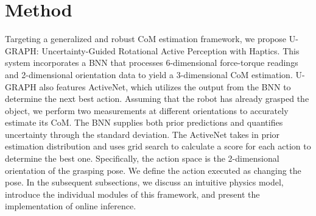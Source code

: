 

\section{Method}

Targeting a generalized and robust CoM estimation framework, we propose U-GRAPH: Uncertainty-Guided Rotational Active Perception with Haptics. This system incorporates a BNN that processes 6-dimensional force-torque readings and 2-dimensional orientation data to yield a 3-dimensional CoM estimation. U-GRAPH also features ActiveNet, which utilizes the output from the BNN to determine the next best action. Assuming that the robot has already grasped the object, we perform two measurements at different orientations to accurately estimate its CoM. The BNN supplies both prior predictions and quantifies uncertainty through the standard deviation. The ActiveNet takes in prior estimation distribution and uses grid search to calculate a score for each action to determine the best one. Specifically, the action space is the 2-dimensional orientation of the grasping pose. We define the action executed as changing the pose. In the subsequent subsections, we discuss an intuitive physics model, introduce the individual modules of this framework, and present the implementation of online inference.


